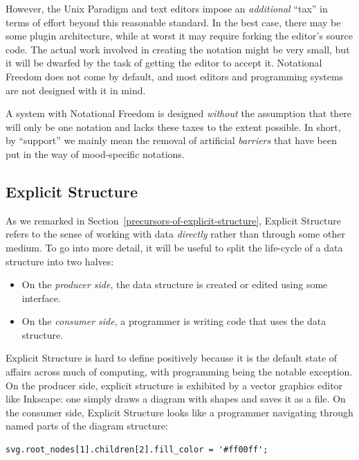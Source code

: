 \documentclass[ twoside,openright,titlepage,numbers=noenddot,headinclude,footinclude,cleardoublepage=empty,abstract=on,
                BCOR=5mm,paper=a4,fontsize=11pt
                ]{scrreprt}
\providecommand{\tightlist}{}\newenvironment{longtable}[2]{\begin{tabular}}{\end{tabular}}
\theoremstyle{definition}
\begin{document}
However, the Unix Paradigm and text editors impose an \emph{additional}
``tax'' in terms of effort beyond this reasonable standard. In the best
case, there may be some plugin architecture, while at worst it may
require forking the editor's source code. The actual work involved in
creating the notation might be very small, but it will be dwarfed by the
task of getting the editor to accept it. Notational Freedom does not
come by default, and most editors and programming systems are not
designed with it in mind.

A system with Notational Freedom is designed \emph{without} the
assumption that there will only be one notation and lacks these taxes to
the extent possible. In short, by ``support'' we mainly mean the removal
of artificial \emph{barriers} that have been put in the way of
mood-specific notations.

\hypertarget{explicit-structure}{\subsection{Explicit Structure}\label{explicit-structure}}

As we remarked in Section~\ref{precursors-of-explicit-structure},
Explicit Structure refers to the sense of working with data
\emph{directly} rather than through some other medium. To go into more
detail, it will be useful to split the life-cycle of a data structure
into two halves:

\begin{itemize}
\tightlist
\item
  On the \emph{producer side}, the data structure is created or edited
  using some interface.
\item
  On the \emph{consumer side}, a programmer is writing code that uses
  the data structure.
\end{itemize}

Explicit Structure is hard to define positively because it is the
default state of affairs across much of computing, with programming
being the notable exception. On the producer side, explicit structure is
exhibited by a vector graphics editor like Inkscape: one simply draws a
diagram with shapes and saves it as a file. On the consumer side,
Explicit Structure looks like a programmer navigating through named
parts of the diagram structure:

\begin{verbatim}
svg.root_nodes[1].children[2].fill_color = '#ff00ff';
\end{verbatim}
\end{document}
